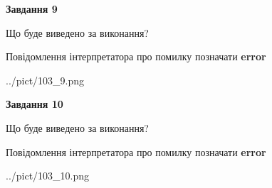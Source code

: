 \documentclass[12pt, ukrainian]{article}
\begin{document}
{{\begin {center}\textbf{Завдання 9}\end {center}}\par
Що буде виведено за виконання? \par
Повідомлення інтерпретатора про помилку позначати \textbf{error}

\begin{center}
	{../pict/103_9.png}
\end{center}
\newpage

{\begin {center}\textbf{Завдання 10}\end {center}}\par
Що буде виведено за виконання? \par
Повідомлення інтерпретатора про помилку позначати \textbf{error}

\begin{center}
	{../pict/103_10.png}
\end{center}
\newpage

}
\end{document}
